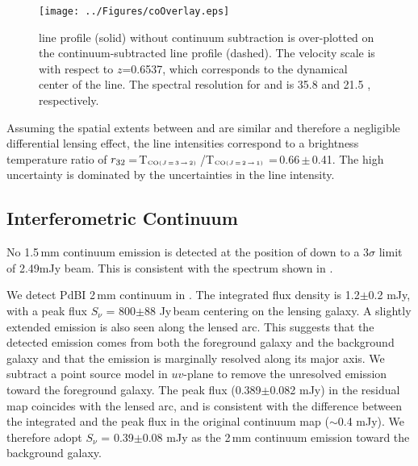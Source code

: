 \documentclass[]{emulateapj}
\begin{document}
\begin{figure}[!Htbp]
\centering
\texttt{[image: ../Figures/coOverlay.eps]}
\caption{\carma \cco line profile (solid) without continuum subtraction is
over-plotted on the continuum-subtracted \bco line profile (dashed).
The velocity scale is with respect to $z$=0.6537, which corresponds to the
dynamical center of the \bco line. The spectral resolution for \cco and \bco
is 35.8 \kms and 21.5 \kms, respectively.
 \label{fig:co32spec}}
\end{figure}

Assuming the spatial extents between \bco and \cco are similar and therefore
a negligible differential lensing effect, the line intensities
correspond to a brightness temperature ratio of
$r_{\rm 32}$\,=\,T$_{\tiny \mbox{CO($J$\,=\,3\,$\rightarrow$\,2) }}$/T$_{\tiny \mbox{CO($J$\,=\,2\,$\rightarrow$\,1) }}$\,=\,0.66\,$\pm$\,0.41.
The high uncertainty is dominated by the uncertainties in the \cco line
intensity.

\subsection{Interferometric Continuum} %
No 1.5\,mm continuum emission is detected at the position of \cco
down to a 3$\sigma$ limit of 2.49mJy beam\pmOne.
This is consistent with the spectrum shown in .

We detect PdBI 2\,mm continuum in . The integrated flux density is
1.2$\pm$0.2 mJy, with a peak flux $S_\nu$ = 800$\pm$88 \micron Jy\,beam\pmOne
centering on the lensing galaxy. A slightly extended emission is also seen
along the lensed arc. This suggests that the detected emission comes from
both the foreground galaxy and the background galaxy and that the
emission is marginally resolved along its major axis.
We subtract a point source model in $uv$-plane to remove the unresolved
emission toward the foreground galaxy. The peak flux (0.389$\pm$0.082 mJy)
in the residual map coincides with the lensed arc, and is consistent with
the difference between the integrated and the peak flux in the
original continuum map ($\sim$0.4 mJy). We therefore adopt
$S_\nu$ = 0.39$\pm$0.08 mJy as the 2\,mm continuum emission toward
the background galaxy.
\end{document}
